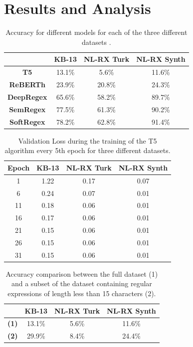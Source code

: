 \documentclass[11pt,a4paper]{article}
\begin{document}

\section{Results and Analysis}



\begin{table}
\centering
\begin{tabular}{|c|c|c|c|}
\hline
 & \textbf{KB-13} & \textbf{NL-RX Turk} & \textbf{NL-RX Synth}\\
\hline
\textbf{T5} & 13.1\% & 5.6\% & 11.6\% \\
\textbf{ReBERTh} & 23.9\% & 20.8\% & 24.3\% \\
\textbf{DeepRegex} & 65.6\% & 58.2\% & 89.7\% \\
\textbf{SemRegex} & 77.5\% & 61.3\% & 90.2\% \\
\textbf{SoftRegex} & 78.2\% & 62.8\% & 91.4\% \\\hline
\end{tabular}
\caption{Accuracy for different models for each of the three different datasets \cite{park-etal-2019-softregex}.}\label{tab:accents}
\end{table}

\begin{table}
\centering
\begin{tabular}{|c|c|c|c|}
\hline
\textbf{Epoch} & \textbf{KB-13} & \textbf{NL-RX Turk} & \textbf{NL-RX Synth}\\
\hline
1 & 1.22  & 0.17 & 0.07 \\
6 & 0.24  & 0.07 & 0.01  \\
11 & 0.18  & 0.06 & 0.01  \\
16 & 0.17  & 0.06 & 0.01  \\
21 & 0.15 & 0.06 & 0.01  \\
26 & 0.15  & 0.06 & 0.01  \\
31 & 0.15  & 0.06 & 0.01 \\\hline
\end{tabular}
\caption{Validation Loss during the training of the T5 algorithm every 5th epoch for three different datasets.}\label{tab:accents}
\end{table}

\begin{table}
\centering
\begin{tabular}{|c|c|c|c|}
\hline
 & \textbf{KB-13} & \textbf{NL-RX Turk} & \textbf{NL-RX Synth}\\
\hline
\textbf{(1)} & 13.1\% & 5.6\% & 11.6\% \\
\textbf{(2)} & 29.9\% & 8.4\% & 24.4\% \\\hline
\end{tabular}
\caption{Accuracy comparison between the full dataset (1) and a subset of the dataset containing regular expressions of length less than 15 characters (2).}\label{tab:accents}
\end{table}
\end{document}
